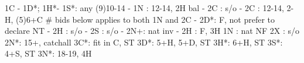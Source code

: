 1C - 1D*; 1H*-
1S*: any (9)10-14
   - 1N : 12-14, 2H bal
        - 2C : s/o
   - 2C : 12-14, 2-H, (5)6+C
   # bids below applies to both 1N and 2C
        - 2D*: F, not prefer to declare NT
        - 2H : s/o
        - 2S : s/o
        - 2N+: nat inv
   - 2H : F, 3H
1N : nat NF
2X : s/o
2N*: 15+, catchall
3C*: fit in C, ST
3D*: 5+H, 5+D, ST
3H*: 6+H, ST
3S*: 4+S, ST
3N*: 18-19, 4H

